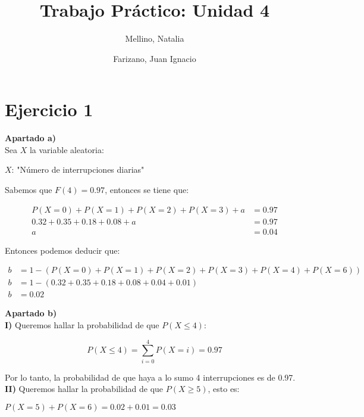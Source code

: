 \documentclass[11pt]{article}
\title{Trabajo Práctico: Unidad 4}
\author{Mellino, Natalia \and Farizano, Juan Ignacio}
\date{}
\begin{document}
\maketitle

\section*{Ejercicio 1}

\textbf{Apartado a)} \\

Sea $ X $ la variable aleatoria:

\begin{center}
  $ X $: "Número de interrupciones diarias"
\end{center}

Sabemos que $ F(4) = 0.97 $, entonces se tiene que:


\begin{align*}
  P(X = 0) + P(X = 1) + P(X = 2) + P(X = 3) + a & =  0.97 \\
  0.32 + 0.35 + 0.18 + 0.08 + a                 & =  0.97 \\
  a                                             & =  0.04
\end{align*}

Entonces podemos deducir que:

\begin{align*}
  b & =  1 - (P(X = 0) + P(X = 1) + P(X = 2) + P(X = 3) + P(X = 4) + P(X = 6)) \\
  b & =  1 - (0.32 + 0.35 + 0.18 + 0.08 + 0.04 + 0.01)                         \\
  b & =  0.02
\end{align*}


\textbf{Apartado b)} \\

\textbf{I)} Queremos hallar la probabilidad de que $ P(X \leq 4) $:

\[ P(X \leq 4) = \sum_{i=0}^{4}P(X = i) = 0.97 \]

Por lo tanto, la probabilidad de que haya a lo sumo 4 interrupciones es de 0.97.\\

\textbf{II)} Queremos hallar la probabilidad de que $ P(X \geq 5) $, esto es:

\begin{center}
  $ P(X = 5) + P(X = 6) = 0.02 + 0.01 = 0.03$
\end{center}
\end{document}
